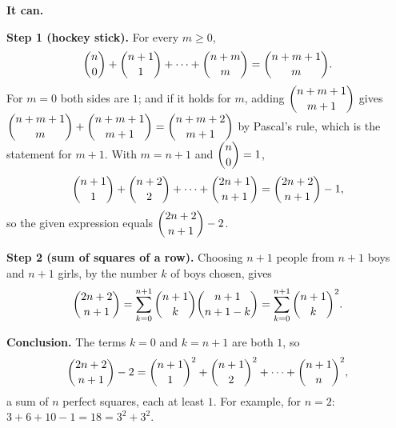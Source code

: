 \textbf{It can.}

\textbf{Step 1 (hockey stick).} For every $m\ge0$,
\[\dbinom{n}{0}+\dbinom{n+1}{1}+\cdots+\dbinom{n+m}{m}=\dbinom{n+m+1}{m}.\]
For $m=0$ both sides are $1$; and if it holds for $m$, adding $\dbinom{n+m+1}{m+1}$ gives $\dbinom{n+m+1}{m}+\dbinom{n+m+1}{m+1}=\dbinom{n+m+2}{m+1}$ by Pascal's rule, which is the statement for $m+1$. With $m=n+1$ and $\dbinom n0=1$,
\[\dbinom{n+1}{1}+\dbinom{n+2}{2}+\cdots+\dbinom{2n+1}{n+1}=\dbinom{2n+2}{n+1}-1,\]
so the given expression equals $\dbinom{2n+2}{n+1}-2$.

\textbf{Step 2 (sum of squares of a row).} Choosing $n+1$ people from $n+1$ boys and $n+1$ girls, by the number $k$ of boys chosen, gives
\[\dbinom{2n+2}{n+1}=\sum_{k=0}^{n+1}\dbinom{n+1}{k}\dbinom{n+1}{n+1-k}=\sum_{k=0}^{n+1}\dbinom{n+1}{k}^2.\]

\textbf{Conclusion.} The terms $k=0$ and $k=n+1$ are both $1$, so
\[\dbinom{2n+2}{n+1}-2=\dbinom{n+1}{1}^2+\dbinom{n+1}{2}^2+\cdots+\dbinom{n+1}{n}^2,\]
a sum of $n$ perfect squares, each at least $1$. For example, for $n=2$: $3+6+10-1=18=3^2+3^2$.
